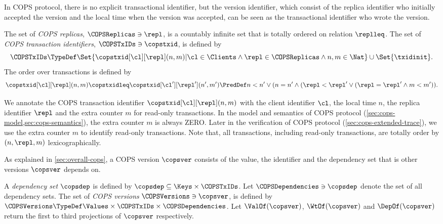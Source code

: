 In COPS protocol, there is no explicit transactional identifier,
but the version identifier,
which consist of the replica identifier who initially accepted the version 
and the local time when the version was accepted,
can be seen as the transactional identifier who wrote the version.

\begin{definition}
The set of \emph{COPS replicas}, \( \COPSReplicas \ni \repl \), 
is a countably infinite set that is totally ordered on relation \( \replleq \).
The set of \emph{COPS transaction identifiers}, \( \COPSTxIDs \ni \copstxid \),
is defined by
\[ 
    \COPSTxIDs \TypeDef \Set{\copstxid[\cl][\repl](n,m) | 
    \cl \in \Clients \land \repl \in \COPSReplicas \land n,m \in \Nat } \cup \Set{\txidinit}.
\]
The order over transactions is defined by
\[ 
\copstxid[\cl][\repl](n,m) \copstxidleq \copstxid[\cl'][\repl'](n',m')
\PredDef n < n' \lor ( n = n' \land ( \repl < \repl' \lor ( \repl = \repl' \land m < m' ) ) .
\]
\end{definition}

We annotate the COPS transaction identifier \(\copstxid[\cl][\repl](n,m)  \)
with the client identifier \( \cl \), the local time \(n\),
the replica identifier \( \repl \)
and the extra counter \( m \) for read-only transactions.
In the model and semantics of COPS protocol (\cref{sec:cops-model,sec:cops-semantics}), 
the extra counter \(m\) is always ZERO.
Later in the verification of COPS protocol (\cref{sec:cops-extended-trace}),
we use the extra counter \( m \) to identify read-only transactions.
Note that, all transactions, including read-only transactions,
are totally order by \( (n,\repl,m) \) lexicographically.

As explained in \cref{sec:overall-cops},
a COPS version \( \copsver \) consists of the value, the identifier 
and the dependency set that is other versions \( \copsver \) depends on.

\begin{definition}
A \emph{dependency set} \( \copsdep \) 
is defined by \( \copsdep \subseteq \Keys \times \COPSTxIDs \).
Let \( \COPSDependencies \ni \copsdep \) denote the set of all dependency sets.
The set of \emph{COPS versions} \( \COPSVersions \ni \copsver \), is defined by 
\( \COPSVersions \TypeDef \Values \times \COPSTxIDs  \times \COPSDependencies \).
Let \(\ValOf(\copsver)\), \(\WtOf(\copsver)\)  
and \( \DepOf(\copsver)\) return the first to third projections of \( \copsver \) respectively.
\end{definition}

